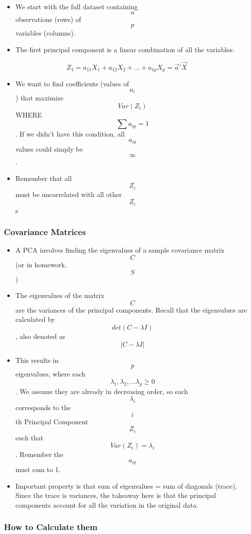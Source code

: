 \documentclass[]{article}
\providecommand{\tightlist}{%
  \setlength{\itemsep}{0pt}\setlength{\parskip}{0pt}}
\begin{document}
\begin{itemize}
\tightlist
\item
  We start with the full dataset containing \[n\] observations (rows) of
  \[p\] variables (columns).
\item
  The first principal component is a linear combination of all the
  variables:
\end{itemize}

\[Z_1 = a_{11}X_1 + a_{12}X_2 + ... + a_{1p}X_p = \vec{a}'\vec{X}\]

\begin{itemize}
\tightlist
\item
  We want to find coefficients (values of \[a_i\]) that maximize
  \[Var(Z_i)\] WHERE \[\sum{a_{ip}} = 1\]. If we didn't have this
  condition, all \[a_{ip}\] values could simply be \[\infty\].
\item
  Remember that all \[Z_i\] must be uncorrelated with all other \[Z_i\]s
\end{itemize}

\hypertarget{covariance-matrices}{%
\subsubsection{Covariance Matrices}\label{covariance-matrices}}

\begin{itemize}
\tightlist
\item
  A PCA involves finding the eigenvalues of a sample covariance matrix
  \[C\] (or in homework, \[S\])
\item
  The eigenvalues of the matrix \[C\] are the variances of the principal
  components. Recall that the eigenvalues are calculated by
  \[det(C - \lambda I)\], also denoted as \[| C - \lambda I |\]
\item
  This results in \[p\] eigenvalues, where each
  \[\lambda_1, \lambda_2, ...\lambda_p \ge 0\]. We assume they are
  already in decreasing order, so each \[\lambda_i\] corresponds to the
  \[i\]th Principal Component \[Z_i\] such that
  \[Var(Z_i) = \lambda_i\]. Remember the \[a_{ip}\] must sum to 1.
\item
  Important property is that sum of eigenvalues = sum of diagonals
  (trace). Since the trace is variances, the takeaway here is that the
  principal components account for all the variation in the original
  data.
\end{itemize}

\hypertarget{how-to-calculate-them}{%
\subsubsection{How to Calculate them}\label{how-to-calculate-them}}
\end{document}
